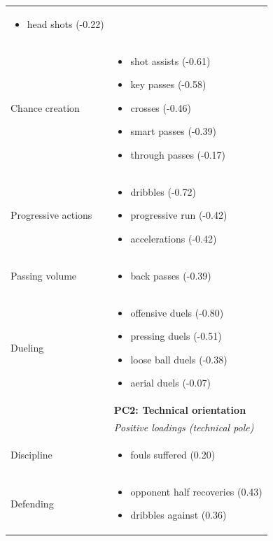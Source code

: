 \begin{longtable}{p{2.6cm}p{13cm}}
\begin{itemize}[nosep,leftmargin=1.1em,topsep=1pt]
    \item head shots (-0.22)
  \end{itemize}\\
Chance creation & \begin{itemize}[nosep,leftmargin=1.1em,topsep=1pt]
    \item shot assists (-0.61)
    \item key passes (-0.58)
    \item crosses (-0.46)
    \item smart passes (-0.39)
    \item through passes (-0.17)
  \end{itemize}\\
Progressive actions & \begin{itemize}[nosep,leftmargin=1.1em,topsep=1pt]
    \item dribbles (-0.72)
    \item progressive run (-0.42)
    \item accelerations (-0.42)
  \end{itemize}\\
Passing volume & \begin{itemize}[nosep,leftmargin=1.1em,topsep=1pt]
    \item back passes (-0.39)
  \end{itemize}\\
Dueling & \begin{itemize}[nosep,leftmargin=1.1em,topsep=1pt]
    \item offensive duels (-0.80)
    \item pressing duels (-0.51)
    \item loose ball duels (-0.38)
    \item aerial duels (-0.07)
  \end{itemize}\\[8pt]
 & \rule{0pt}{2.2ex}\textbf{PC2: Technical orientation}\\
 & \textit{Positive loadings (technical pole)}\\
Discipline & \begin{itemize}[nosep,leftmargin=1.1em,topsep=1pt]
    \item fouls suffered (0.20)
  \end{itemize}\\
Defending & \begin{itemize}[nosep,leftmargin=1.1em,topsep=1pt]
    \item opponent half recoveries (0.43)
    \item dribbles against (0.36)

\end{itemize}
\end{longtable}
